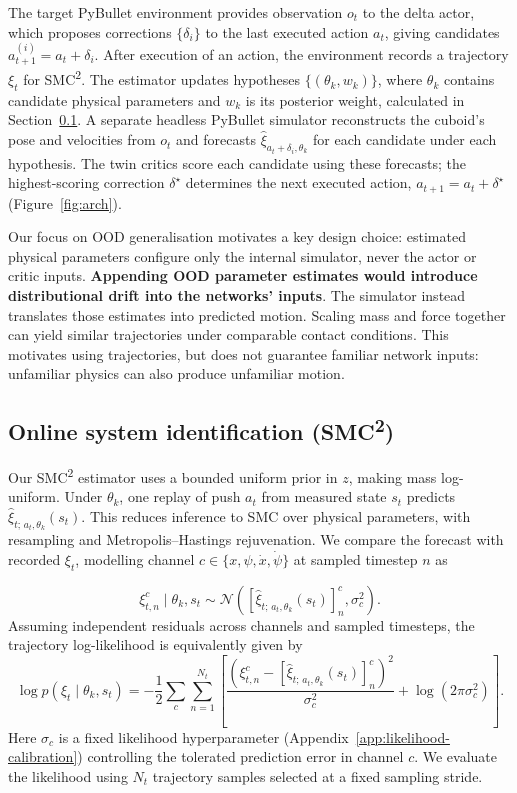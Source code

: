 \documentclass[12pt]{article}
\begin{document}
The target PyBullet environment \cite{pybullet} provides observation $o_t$ to the delta actor, which proposes corrections $\{\delta_i\}$ to the last executed action $a_t$, giving candidates $a_{t+1}^{(i)}=a_t+\delta_i$. After execution of an action, the environment records a trajectory $\xi_t$ for SMC\textsuperscript{2}. The estimator updates hypotheses $\{(\theta_k,w_k)\}$, where $\theta_k$ contains candidate physical parameters and $w_k$ is its posterior weight, calculated in Section~\ref{sec:sysid}. A separate headless PyBullet simulator reconstructs the cuboid's pose and velocities from $o_t$ and forecasts $\hat{\xi}_{a_t+\delta_i,\theta_k}$ for each candidate under each hypothesis. The twin critics score each candidate using these forecasts; the highest-scoring correction $\delta^\star$ determines the next executed action, $a_{t+1}=a_t+\delta^\star$ (Figure~\ref{fig:arch}).

Our focus on OOD generalisation motivates a key design choice: estimated physical parameters configure only the internal simulator, never the actor or critic inputs. \textbf{Appending OOD parameter estimates would introduce distributional drift into the networks' inputs}. The simulator instead translates those estimates into predicted motion. Scaling mass and force together can yield similar trajectories under comparable contact conditions. This motivates using trajectories, but does not guarantee familiar network inputs: unfamiliar physics can also produce unfamiliar motion.

\subsection{Online system identification (SMC\texorpdfstring{\textsuperscript{2}}{2})}\label{sec:sysid}
Our SMC\textsuperscript{2} estimator \cite{smc2} uses a bounded uniform prior in $z$, making mass log-uniform. Under $\theta_k$, one replay of push $a_t$ from measured state $s_t$ predicts $\hat{\xi}_{t;\,a_t,\theta_k}(s_t)$. This reduces inference to SMC over physical parameters, with resampling and Metropolis--Hastings rejuvenation. We compare the forecast with recorded $\xi_t$, modelling channel $c\in\{x,\psi,\dot x,\dot\psi\}$ at sampled timestep $n$ as

\begin{equation}\label{eq:sample-likelihood}
\xi_{t,n}^{c}\mid\theta_k,s_t
\sim\mathcal N\!\left(
[\hat{\xi}_{t;\,a_t,\theta_k}(s_t)]^c_n,\sigma_c^2
\right).
\end{equation}
Assuming independent residuals across channels and sampled timesteps, the trajectory log-likelihood is equivalently given by
\begin{equation}\label{eq:trajectory-likelihood}
\log p(\xi_t\mid \theta_k,s_t)=-\frac12\sum_c\sum_{n=1}^{N_t}\left[
\frac{(\xi^c_{t,n}-[\hat{\xi}_{t;\,a_t,\theta_k}(s_t)]^c_n)^2}{\sigma_c^2}+\log(2\pi\sigma_c^2)\right].
\end{equation}
Here $\sigma_c$ is a fixed likelihood hyperparameter (Appendix~\ref{app:likelihood-calibration}) controlling the tolerated prediction error in channel $c$. We evaluate the likelihood using $N_t$ trajectory samples selected at a fixed sampling stride.
\end{document}
